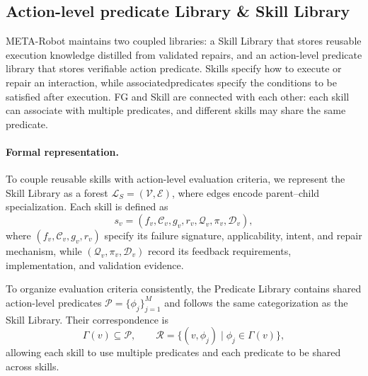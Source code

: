 \documentclass{article} %
\begin{document}
\subsection{Action-level predicate Library \& Skill Library}
\label{sec:skill_library}
META-Robot maintains two coupled libraries: a Skill Library that stores reusable execution knowledge distilled from validated repairs, and an action-level predicate library that stores verifiable action predicate. Skills specify how to execute or repair an interaction, while associatedpredicates specify the conditions to be satisfied after execution. FG and Skill are connected with each other: each skill can associate with multiple predicates, and different skills may share the same predicate.

\paragraph{Formal representation.}
To couple reusable skills with action-level evaluation criteria, we represent the Skill Library as a forest
$\mathcal{L}_{S}=(\mathcal{V},\mathcal{E})$, where edges encode parent--child specialization. Each skill is defined as
\begin{equation}
s_v=
\left(
f_v,\mathcal{C}_v,g_v,r_v,
\mathcal{Q}_v,\pi_v,\mathcal{D}_v
\right),
\end{equation}
where $(f_v,\mathcal{C}_v,g_v,r_v)$ specify its failure signature, applicability, intent, and repair mechanism, while $(\mathcal{Q}_v,\pi_v,\mathcal{D}_v)$ record its feedback requirements, implementation, and validation evidence.

To organize evaluation criteria consistently, the Predicate Library contains shared action-level predicates
$\mathcal{P}=\{\phi_j\}_{j=1}^{M}$ and follows the same categorization as the Skill Library. Their correspondence is
\begin{equation}
\Gamma(v)\subseteq\mathcal{P},
\qquad
\mathcal{R}
=
\{(v,\phi_j)\mid\phi_j\in\Gamma(v)\},
\label{eq:skill_predicate_relation}
\end{equation}
allowing each skill to use multiple predicates and each predicate to be shared across skills.
\end{document}

